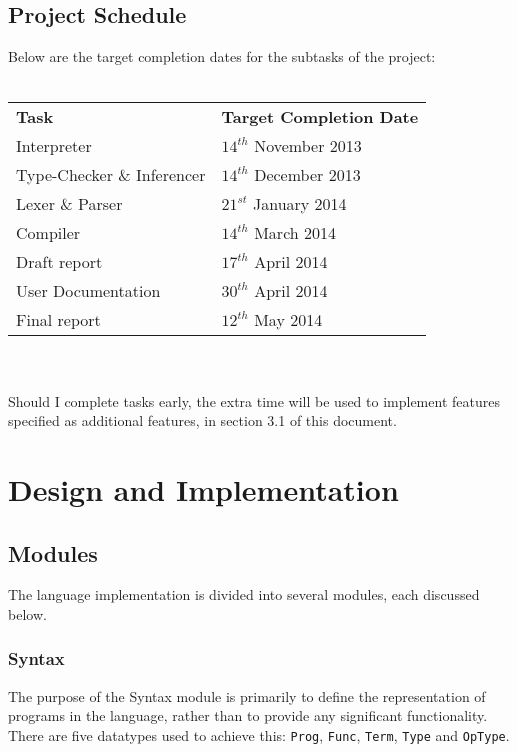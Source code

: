 \documentclass{article}
\begin{document}
\subsection{Project Schedule}
Below are the target completion dates for the subtasks of the project:
\\\\
\begin{tabular}{l l}
    \indent \textbf{Task}              & \textbf{Target Completion Date} \\
    \indent Interpreter                & $14^{th}$ November 2013         \\
    \indent Type-Checker \& Inferencer & $14^{th}$ December 2013         \\
    \indent Lexer \& Parser            & $21^{st}$ January  2014         \\
    \indent Compiler                   & $14^{th}$ March    2014         \\
    \indent Draft report               & $17^{th}$ April    2014         \\
    \indent User Documentation         & $30^{th}$ April    2014         \\
    \indent Final report               & $12^{th}$ May      2014         \\
\end{tabular}
\\\\
Should I complete tasks early, the extra time will be used to implement features specified as additional features, in section 3.1 of this document.

\pagebreak
\section{Design and Implementation}
\subsection{Modules}
The language implementation is divided into several modules, each discussed below.
\subsubsection{Syntax}
The purpose of the Syntax module is primarily to define the representation of programs in the language, rather than to provide any significant functionality. There are five datatypes used to achieve this: \texttt{Prog}, \texttt{Func}, \texttt{Term}, \texttt{Type} and \texttt{OpType}.
\end{document}
